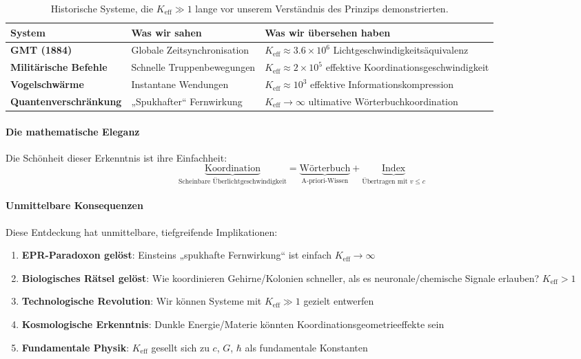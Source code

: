 \documentclass[11pt,a4paper]{article}
\begin{document}
	\begin{table}[htbp]
		\centering
		\begin{tabular}{p{}p{}p{}}
			\toprule
			\textbf{System} & \textbf{Was wir sahen} & \textbf{Was wir übersehen haben} \\
			\midrule
			\textbf{GMT (1884)} & Globale Zeitsynchronisation & $K_{\mathrm{eff}} \approx 3.6\times10^6$ Lichtgeschwindigkeitsäquivalenz \\
			\textbf{Militärische Befehle} & Schnelle Truppenbewegungen & $K_{\mathrm{eff}} \approx 2\times10^5$ effektive Koordinationsgeschwindigkeit \\
			\textbf{Vogelschwärme} & Instantane Wendungen & $K_{\mathrm{eff}} \approx 10^3$ effektive Informationskompression \\
			\textbf{Quantenverschränkung} & „Spukhafter“ Fernwirkung & $K_{\mathrm{eff}} \to \infty$ ultimative Wörterbuchkoordination \\
			\bottomrule
		\end{tabular}
		\caption{Historische Systeme, die $K_{\mathrm{eff}} \gg 1$ lange vor unserem Verständnis des Prinzips demonstrierten.}
	\end{table}
	
	\paragraph{Die mathematische Eleganz}
	Die Schönheit dieser Erkenntnis ist ihre Einfachheit:
	\begin{equation}
		\underbrace{\text{Koordination}}_{\text{Scheinbare Überlichtgeschwindigkeit}} = 
		\underbrace{\text{Wörterbuch}}_{\text{A-priori-Wissen}} + 
		\underbrace{\text{Index}}_{\text{Übertragen mit } v \leq c}
	\end{equation}
	
	\paragraph{Unmittelbare Konsequenzen}
	Diese Entdeckung hat unmittelbare, tiefgreifende Implikationen:
	
	\begin{enumerate}
		\item \textbf{EPR-Paradoxon gelöst}: Einsteins „spukhafte Fernwirkung“ ist einfach $K_{\mathrm{eff}} \to \infty$
		
		\item \textbf{Biologisches Rätsel gelöst}: Wie koordinieren Gehirne/Kolonien schneller, als es neuronale/chemische Signale erlauben? $K_{\mathrm{eff}} > 1$
		
		\item \textbf{Technologische Revolution}: Wir können Systeme mit $K_{\mathrm{eff}} \gg 1$ gezielt entwerfen
		
		\item \textbf{Kosmologische Erkenntnis}: Dunkle Energie/Materie könnten Koordinationsgeometrieeffekte sein
		
		\item \textbf{Fundamentale Physik}: $K_{\mathrm{eff}}$ gesellt sich zu $c$, $G$, $\hbar$ als fundamentale Konstanten
	\end{enumerate}
	
\end{document}
